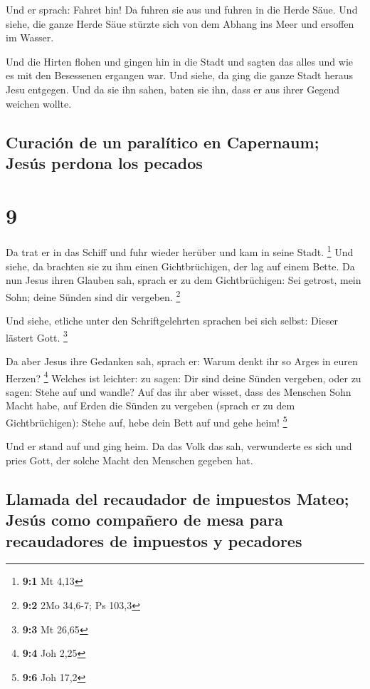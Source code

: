  Und er sprach: Fahret hin! Da fuhren sie aus und fuhren
in die Herde Säue. Und siehe, die ganze Herde Säue stürzte sich von dem
Abhang ins Meer und ersoffen im Wasser.

 Und die Hirten flohen und gingen hin in die Stadt und
sagten das alles und wie es mit den Besessenen ergangen war.
 Und siehe, da ging die ganze Stadt heraus Jesu entgegen.
Und da sie ihn sahen, baten sie ihn, dass er aus ihrer Gegend weichen
wollte.

\hypertarget{curaciuxf3n-de-un-paraluxedtico-en-capernaum-jesuxfas-perdona-los-pecados}{%
\subsection{Curación de un paralítico en Capernaum; Jesús perdona los
pecados}\label{curaciuxf3n-de-un-paraluxedtico-en-capernaum-jesuxfas-perdona-los-pecados}}

\hypertarget{section-8}{%
\section{9}\label{section-8}}

 Da trat er in das Schiff und fuhr wieder herüber und kam
in seine Stadt. \footnote{\textbf{9:1} Mt 4,13}  Und
siehe, da brachten sie zu ihm einen Gichtbrüchigen, der lag auf einem
Bette. Da nun Jesus ihren Glauben sah, sprach er zu dem Gichtbrüchigen:
Sei getrost, mein Sohn; deine Sünden sind dir vergeben. \footnote{\textbf{9:2}
  2Mo 34,6-7; Ps 103,3}

 Und siehe, etliche unter den Schriftgelehrten sprachen
bei sich selbst: Dieser lästert Gott. \footnote{\textbf{9:3} Mt 26,65}

 Da aber Jesus ihre Gedanken sah, sprach er: Warum denkt
ihr so Arges in euren Herzen? \footnote{\textbf{9:4} Joh 2,25}
 Welches ist leichter: zu sagen: Dir sind deine Sünden
vergeben, oder zu sagen: Stehe auf und wandle?  Auf das
ihr aber wisset, dass des Menschen Sohn Macht habe, auf Erden die Sünden
zu vergeben (sprach er zu dem Gichtbrüchigen): Stehe auf, hebe dein Bett
auf und gehe heim! \footnote{\textbf{9:6} Joh 17,2}

 Und er stand auf und ging heim.  Da das
Volk das sah, verwunderte es sich und pries Gott, der solche Macht den
Menschen gegeben hat.

\hypertarget{llamada-del-recaudador-de-impuestos-mateo-jesuxfas-como-compauxf1ero-de-mesa-para-recaudadores-de-impuestos-y-pecadores}{%
\subsection{Llamada del recaudador de impuestos Mateo; Jesús como
compañero de mesa para recaudadores de impuestos y
pecadores}\label{llamada-del-recaudador-de-impuestos-mateo-jesuxfas-como-compauxf1ero-de-mesa-para-recaudadores-de-impuestos-y-pecadores}}

